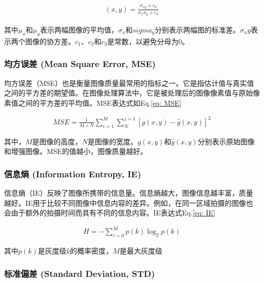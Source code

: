 \documentclass[letterpaper,12pt]{article}
\begin{document}
			\begin{equation}
				\begin{aligned}
					(x, y) = \frac{\sigma_{xy} + c_3}{\sigma_{x}\sigma_{y} + c_3}
				\end{aligned}
				\label{eq: (x, y)}
			\end{equation}
			
			其中$\mu_x$和$\mu_y$表示两幅图像的平均值，$\sigma_x$和$sigma_y$分别表示两幅图的标准差。$\sigma_xy$表示两个图像的协方差。$c_1$、$c_2$和$c_3$是常数，以避免分母为0。
			
			\subsubsection{均方误差 (Mean Square Error, MSE)}
			
			均方误差（MSE）也是衡量图像质量最常用的指标之一。它是指估计值与真实值之间的平方差的期望值。在图像处理算法中，它是被处理后的图像像素值与原始像素值之间的平方差的平均值。MSE表达式如Eq.\ref{eq: MSE}
			
			\begin{equation}
				\begin{aligned}
					MSE = \frac{1}{M \times N} \sum_{i=1}^{M} \sum_{N}^{j=1}{\left[ g(x,y) - \hat{g}(x,y) \right]}^2
				\end{aligned}
				\label{eq: MSE}
			\end{equation}
			
			其中，$M$是图像的高度，$N$是图像的宽度。$g(x,y)$和$\hat{g}(x,y)$分别表示原始图像和增强图像。MSE的值越小，图像质量越好。
			
			
			\subsubsection{信息熵 (Information Entropy, IE)}
			
			信息熵（IE）反映了图像所携带的信息量。信息熵越大，图像信息越丰富，质量越好。IE用于比较不同图像中信息内容的差异。例如，在同一区域拍摄的图像也会由于额外的拍摄时间而具有不同的信息内容。IE表达式Eq.\ref{eq: IE}
			
			\begin{equation}
				\begin{aligned}
					H = -\sum_{i=0}^{M} p(k)\log_{2}p(k)
				\end{aligned}
				\label{eq: IE}
			\end{equation}
			
			其中$p(k)$是灰度级$k$的概率密度，$M$是最大灰度级
			
			\subsubsection{标准偏差 (Standard Deviation, STD)}
			
\end{document}
